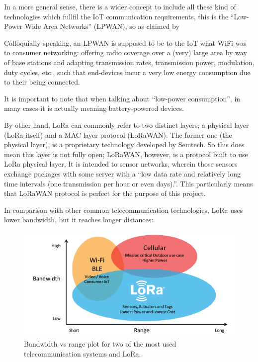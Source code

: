 \documentclass[11pt,a4paper,dvipsnames,twoside]{article}
\begin{document}
In a more general sense, there is a wider concept to include all these kind of technologies which fullfil the IoT communication requirements, this is the \enquote{Low-Power Wide Area Networks} (LPWAN), so as claimed by \cite[]{LoRaGeneral}

\begin{quoting}
  Colloquially  speaking,  an LPWAN is supposed to be to the IoT what WiFi was to consumer networking: offering radio coverage over a (very) large area by way of base stations and adapting transmission rates, transmission power, modulation, duty cycles, etc., such that end-devices incur a very low energy consumption due to their being connected.
\end{quoting}

It is important to note that when talking about \enquote{low-power consumption}, in many cases it is actually meaning battery-powered devices.

By other hand, LoRa can commonly refer to two distinct layers; a physical layer (LoRa itself) and a MAC layer protocol (LoRaWAN). The former one (the physical layer), is a proprietary technology developed by Semtech. So this does mean this layer is not fully open; LoRaWAN, however, is a protocol built to use LoRa physical layer,  It is intended to sensor networks, wherein those sensors exchange packages with some server with a \enquote{low data rate and relatively long time intervals (one transmission per hour or even days).}\cite[p.~9]{LoRaGeneral}. This particularly means that LoRaWAN protocol is perfect for the purpose of this project.  

In comparison with other common telecommunication technologies, LoRa uses lower bandwidth, but it reaches longer distances:

\begin{figure}[htp]
  \centering
  \includegraphics[width=.9\textwidth]{../pictures/LoRa_Why_Range.png}
  \caption{Bandwidth vs range plot for two of the most used telecommunication systems and LoRa.}
  \label{fig:LoraComparison}
\end{figure}
 
\end{document}
